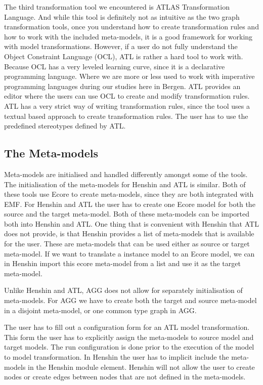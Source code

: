 The third transformation tool we encountered is ATLAS Transformation Language.
And while this tool is definitely not as intuitive as the two graph
transformation tools, once you understand how to create transformation rules
and how to work with the included meta-models, it is a good framework for
working with model transformations. However, if a user do not fully understand
the Object Constraint Language (OCL), ATL is rather a hard tool to work with.
Because OCL has a very leveled learning curve, since it is a declarative
programming language. Where we are more or less used to work with imperative
programming languages during our studies here in Bergen. ATL provides an editor
where the users can use OCL to create and modify transformation rules. ATL has
a very strict way of writing transformation rules, since the tool uses a
textual based approach to create transformation rules. The user has to use the
predefined stereotypes defined by ATL.

\subsection{The Meta-models}
Meta-models are initialised and handled differently amongst some of the tools.
The initialisation of the meta-models for Henshin and ATL is similar. Both of
these tools use Ecore to create meta-models, since they are both integrated with
EMF. For Henshin and ATL the user has to create one Ecore model for both the
source and the target meta-model. Both of these meta-models can be imported both
into Henshin and ATL. One thing that is convenient with Henshin that ATL does
not provide, is that Henshin provides a list of meta-models that is available
for the user. These are meta-models that can be used either as source or target
meta-model. If we want to translate a instance model to an Ecore model, we can
in Henshin import this ecore meta-model from a list and use it as the target meta-model.

Unlike Henshin and ATL, AGG does not allow for separately initialisation of
meta-models. For AGG we have to create both the target and source meta-model in a
disjoint meta-model, or one common type graph in AGG.

The user has to fill out a configuration form for an ATL model transformation.
This form the user has to explicitly assign the meta-models to source model and
target models. The run configuration is done prior to the execution of the model
to model transformation. In Henshin the user has to implicit include the
meta-models in the Henshin module element. Henshin will not allow the user to
create nodes or create edges between nodes that are not defined in the
meta-models. 

